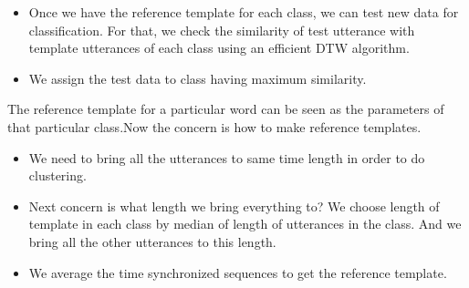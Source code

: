 \documentclass[11pt,paper=a4,answers]{exam}
\begin{document}
\begin{questions}
\begin{itemize}
\begin{enumerate}
\begin{itemize}
                \item Once we have the reference template for each class, we can test new data for classification. For that, we check the similarity of test utterance with template utterances of each class using an efficient DTW algorithm.
                \item We assign the test data to class having maximum similarity.
            \end{itemize}
            The reference template for a particular word can be seen as the parameters of that particular class.Now the concern is how to make reference templates. 

            \begin{itemize}
                \item We need to bring all the utterances to same time length in order to do clustering.
                \item Next concern is what length we bring everything to? We choose length of template in each class by median of length of utterances in the class. And we bring all the other utterances to this length.
                \item We average the time synchronized sequences to get the reference template. 
            \end{itemize}
        
    \end{enumerate}
    
    
\end{itemize}

\end{questions}
\end{document}
